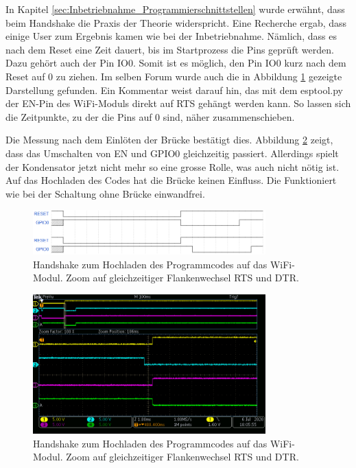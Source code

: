 In Kapitel \ref{sec:Inbetriebnahme_Programmierschnittstellen} wurde erwähnt, dass beim Handshake die Praxis der Theorie widerspricht. Eine Recherche ergab, dass einige User zum Ergebnis kamen wie bei der Inbetriebnahme. Nämlich, dass es nach dem Reset eine Zeit dauert, bis im Startprozess die Pins geprüft werden. Dazu gehört auch der Pin IO0. Somit ist es möglich, den Pin IO0 kurz nach dem Reset auf 0 zu ziehen.
Im selben Forum wurde auch die in Abbildung \ref{fig:ESP32_Handshake_Forum} gezeigte Darstellung gefunden. Ein Kommentar weist darauf hin, das mit dem esptool.py der EN-Pin des WiFi-Moduls direkt auf RTS gehängt werden kann. So lassen sich die Zeitpunkte, zu der die Pins auf 0 sind, näher zusammenschieben. \cite{liudr_trying_2017}

Die Messung nach dem Einlöten der Brücke bestätigt dies. Abbildung \ref{fig:ESP32_RTS_DTR_EN_IO0_mit_Bruecke_1} zeigt, dass das Umschalten von EN und GPIO0 gleichzeitig passiert. Allerdings spielt der Kondensator jetzt nicht mehr so eine grosse Rolle, was auch nicht nötig ist. Auf das Hochladen des Codes hat die Brücke keinen Einfluss. Die Funktioniert wie bei der Schaltung ohne Brücke einwandfrei.


\begin{figure}[H]
\center
\includegraphics[width = 0.8\textwidth]{graphics/ESP32_Handshake_Forum}
\caption{Handshake zum Hochladen des Programmcodes auf das WiFi-Modul. Zoom auf gleichzeitiger Flankenwechsel RTS und DTR. \cite{liudr_trying_2017}}
\label{fig:ESP32_Handshake_Forum}
\end{figure}

\begin{figure}[H]
\center
\includegraphics[width = 0.8\textwidth]{graphics/ESP32_RTS_DTR_EN_IO0_mit_Bruecke_1}
\caption{Handshake zum Hochladen des Programmcodes auf das WiFi-Modul. Zoom auf gleichzeitiger Flankenwechsel RTS und DTR.}
\label{fig:ESP32_RTS_DTR_EN_IO0_mit_Bruecke_1}
\end{figure}
